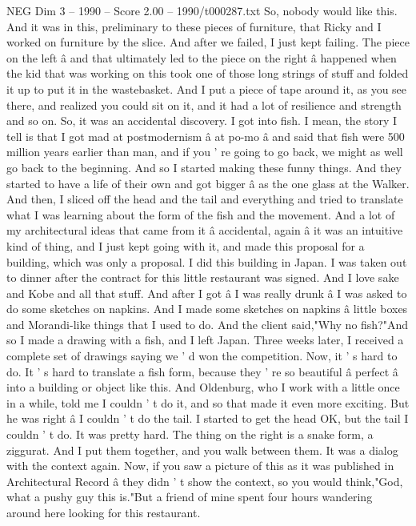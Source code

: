 \begin{textsample}{NEG Dim 3 – 1990 – Score 2.00 – 1990/t000287.txt}
So, nobody would like this.
And it was in this, preliminary to these pieces of furniture, that Ricky and I worked on furniture by the slice.
And after we failed, I just kept failing.
The piece on the left â and that ultimately led to the piece on the right â happened when the kid that was working on this took one of those long strings of stuff and folded it up to put it in the wastebasket.
And I put a piece of tape around it, as you see there, and realized you could sit on it, and it had a lot of resilience and strength and so on.
So, it was an accidental discovery.
I got into fish.
I mean, the story I tell is that I got mad at postmodernism â at po-mo â and said that fish were 500 million years earlier than man, and if you ' re going to go back, we might as well go back to the beginning.
And so I started making these funny things.
And they started to have a life of their own and got bigger â as the one glass at the Walker.
And then, I sliced off the head and the tail and everything and tried to translate what I was learning about the form of the fish and the movement.
And a lot of my architectural ideas that came from it â accidental, again â it was an intuitive kind of thing, and I just kept going with it, and made this proposal for a building, which was only a proposal.
I did this building in Japan.
I was taken out to dinner after the contract for this little restaurant was signed.
And I love sake and Kobe and all that stuff.
And after I got â I was really drunk â I was asked to do some sketches on napkins.
And I made some sketches on napkins â little boxes and Morandi-like things that I used to do.
And the client said,"Why no fish?"And so I made a drawing with a fish, and I left Japan.
Three weeks later, I received a complete set of drawings saying we ' d won the competition.
Now, it ' s hard to do.
It ' s hard to translate a fish form, because they ' re so beautiful â perfect â into a building or object like this.
And Oldenburg, who I work with a little once in a while, told me I couldn ' t do it, and so that made it even more exciting.
But he was right â I couldn ' t do the tail.
I started to get the head OK, but the tail I couldn ' t do.
It was pretty hard.
The thing on the right is a snake form, a ziggurat.
And I put them together, and you walk between them.
It was a dialog with the context again.
Now, if you saw a picture of this as it was published in Architectural Record â they didn ' t show the context, so you would think,"God, what a pushy guy this is."But a friend of mine spent four hours wandering around here looking for this restaurant.

\end{textsample}
